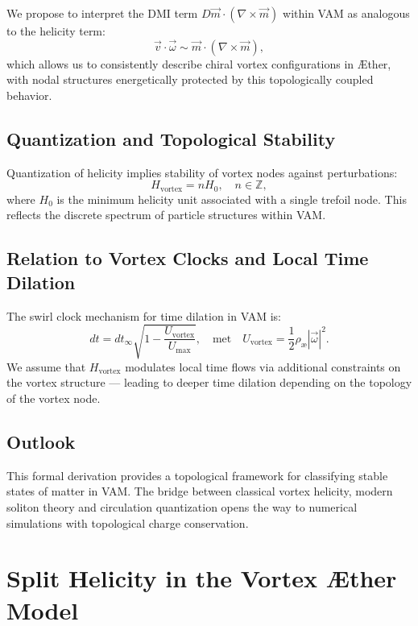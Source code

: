 \documentclass[preprint]{revtex4-2}
\begin{document}
We propose to interpret the DMI term $D \vec{m} \cdot (\nabla \times \vec{m})$ within VAM as analogous to the helicity term:
\begin{equation}
    \vec{v} \cdot \vec{\omega} \sim \vec{m} \cdot (\nabla \times \vec{m}),
\end{equation}
which allows us to consistently describe chiral vortex configurations in Æther, with nodal structures energetically protected by this topologically coupled behavior.

\subsection{Quantization and Topological Stability}

Quantization of helicity implies stability of vortex nodes against perturbations:
\begin{equation}
    H_\text{vortex} = n H_0, \quad n \in \mathbb{Z},
\end{equation}
where $H_0$ is the minimum helicity unit associated with a single trefoil node. This reflects the discrete spectrum of particle structures within VAM.

\subsection{Relation to Vortex Clocks and Local Time Dilation}

The swirl clock mechanism for time dilation in VAM is:
\begin{equation}
    dt = dt_\infty \sqrt{1 - \frac{U_\text{vortex}}{U_\text{max}}},
    \quad \text{met} \quad
    U_\text{vortex} = \frac{1}{2} \rho_\text{\ae} |\vec{\omega}|^2.
\end{equation}
We assume that $H_\text{vortex}$ modulates local time flows via additional constraints on the vortex structure — leading to deeper time dilation depending on the topology of the vortex node.

\subsection{Outlook}

This formal derivation provides a topological framework for classifying stable states of matter in VAM. The bridge between classical vortex helicity, modern soliton theory and circulation quantization opens the way to numerical simulations with topological charge conservation.
\section{Split Helicity in the Vortex Æther Model}\label{sec:appendix:10}
\end{document}
